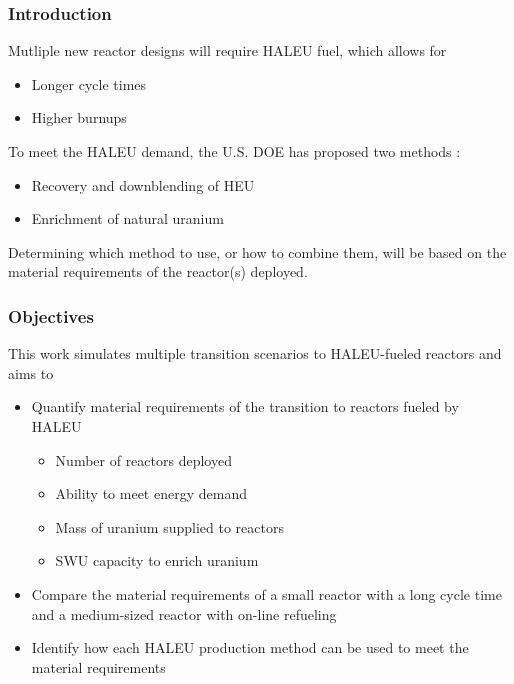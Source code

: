 \begin{frame}
    \frametitle{Introduction}
    Mutliple new reactor designs will require \gls{HALEU} fuel, which allows for 
    \begin{itemize}
        \item Longer cycle times
        \item Higher burnups 
    \end{itemize}
    To meet the \gls{HALEU} demand, the U.S. \gls{DOE} has proposed two methods
    \cite{griffith_overview_2020}:
    \begin{itemize}
        \item Recovery and downblending of \gls{HEU}
        \item Enrichment of natural uranium
    \end{itemize}
    Determining which method to use, or how to combine them, will be based on 
    the material requirements of the reactor(s) deployed.

\end{frame}

\begin{frame}
    \frametitle{Objectives}
    This work simulates multiple transition scenarios to \gls{HALEU}-fueled 
    reactors and aims to 
    \begin{itemize}
        \item Quantify material requirements of the transition to reactors 
              fueled by \gls{HALEU}
              \begin{itemize}
                  \item Number of reactors deployed 
                  \item Ability to meet energy demand
                  \item Mass of uranium supplied to reactors
                  \item \gls{SWU} capacity to enrich uranium
              \end{itemize}
        \item Compare the material requirements of a small reactor with a long cycle 
              time and a medium-sized reactor with on-line refueling
        \item Identify how each \gls{HALEU} production method can be used to 
              meet the material requirements
    \end{itemize}
\end{frame}